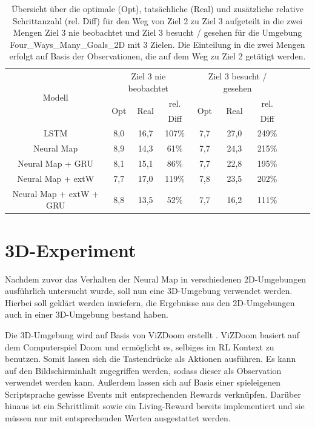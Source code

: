 \begin{table}
  \begin{tabular}{|c|c|c|c|c|c|c|c|c|c|}
    \hline
    \multirow{3}{*}{Modell} & \multicolumn{3}{|c|}{Ziel 3 nie beobachtet} & \multicolumn{3}{|c|}{Ziel 3 besucht / gesehen} \\ \cline{2-7}
    & \multirow{2}{*}{Opt} & \multirow{2}{*}{Real} & rel. & \multirow{2}{*}{Opt} & \multirow{2}{*}{Real} & rel. \\
    & & & Diff & & & Diff \\ \hline
    LSTM & 8,0 & 16,7 & 107\% & 7,7 & 27,0 & 249\% \\ \hline
    Neural Map & 8,9 & 14,3 & 61\% & 7,7 & 24,3 & 215\% \\ \hline
    Neural Map + GRU & 8,1 & 15,1 & 86\% & 7,7 & 22,8 & 195\% \\ \hline
    Neural Map + extW & 7,7 & 17,0 & 119\% & 7,8 & 23,5 & 202\% \\ \hline
    Neural Map + extW + GRU & 8,8 & 13,5 & 52\% & 7,7 & 16,2 & 111\% \\ \hline
  \end{tabular}
  \caption{Übersicht über die optimale (Opt), tatsächliche (Real) und zusätzliche relative Schrittanzahl (rel. Diff) für den Weg von Ziel 2 zu Ziel 3 aufgeteilt in die zwei Mengen \glqq Ziel 3 nie beobachtet\grqq{} und \glqq Ziel 3 besucht / gesehen\grqq{} für die Umgebung \glqq Four\_Ways\_Many\_Goals\_2D\grqq{} mit 3 Zielen. Die Einteilung in die zwei Mengen erfolgt auf Basis der Observationen, die auf dem Weg zu Ziel 2 getätigt werden.}
  \label{results_fw3g_2_to_3_per_M}
\end{table}


\section{3D-Experiment}

Nachdem zuvor das Verhalten der Neural Map in verschiedenen 2D-Umgebungen ausführlich untersucht wurde, soll nun eine 3D-Umgebung verwendet werden. Hierbei soll geklärt werden inwiefern, die Ergebnisse aus den 2D-Umgebungen auch in einer 3D-Umgebung bestand haben.

Die 3D-Umgebung wird auf Basis von ViZDoom erstellt \cite{VizDoom}. ViZDoom basiert auf dem Computerspiel Doom und ermöglicht es, selbiges im RL Kontext zu benutzen. Somit lassen sich die Tastendrücke als Aktionen ausführen. Es kann auf den Bildschirminhalt zugegriffen werden, sodass dieser als Observation verwendet werden kann. Außerdem lassen sich auf Basis einer spieleigenen Scriptsprache gewisse Events mit entsprechenden Rewards verknüpfen. Darüber hinaus ist ein Schrittlimit sowie ein Living-Reward bereits implementiert und sie müssen nur mit entsprechenden Werten ausgestattet werden.

